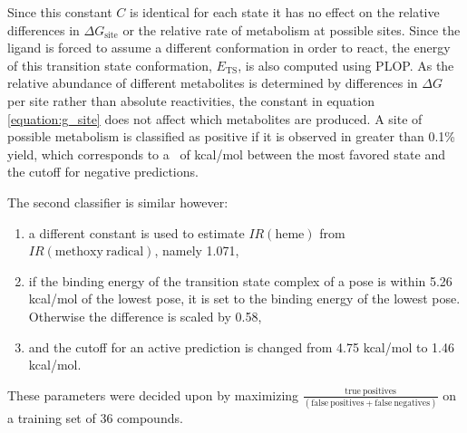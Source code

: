 Since this constant $C$ is identical for each state it has no effect on the relative differences in ${\Delta}G_{\mathrm{site}}$ or the relative rate of metabolism at possible sites.
Since the ligand is forced to assume a different conformation in order to react, the energy of this transition state conformation, $E_{\mathrm{TS}}$, is also computed using PLOP.
As the relative abundance of different metabolites is determined by differences in ${\Delta}G$ per site rather than absolute reactivities, the constant in equation \ref{equation:g_site} does not affect which metabolites are produced.
A site of possible metabolism is classified as positive if it is observed in greater than 0.1\% yield, which corresponds to a \ddg\ of  kcal/mol between the most favored state and the cutoff for negative predictions. 

The second classifier is similar however:
\begin{enumerate}
\item a different constant is used to estimate $IR(\mathrm{heme})$ from $IR(\mathrm{methoxy\ radical})$, namely 1.071,
\item if the binding energy of the transition state complex of a pose is within 5.26 kcal/mol of the lowest pose, it is set to the binding energy of the lowest pose.
Otherwise the difference is scaled by 0.58,
\item and the cutoff for an active prediction is changed from 4.75 kcal/mol to 1.46 kcal/mol.
\end{enumerate}
These parameters were decided upon by maximizing $\frac{\mathrm{true\ positives}}{(\mathrm{false\ positives + false\ negatives})}$ on a training set of 36 compounds.
